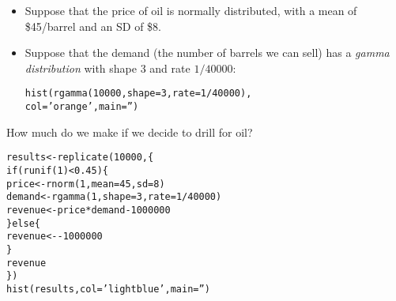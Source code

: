 \documentclass{beamer}\usepackage[]{graphicx}\usepackage[]{color}
\makeatletter
\newcommand{\hlnum}[1]{\textcolor[rgb]{0.824,0.412,0.118}{#1}}%
\newcommand{\hlstr}[1]{\textcolor[rgb]{1,0.894,0.71}{#1}}%
\newcommand{\hlopt}[1]{\textcolor[rgb]{1,0.894,0.769}{#1}}%
\newcommand{\hlstd}[1]{\textcolor[rgb]{1,0.894,0.769}{#1}}%
\newcommand{\hlkwa}[1]{\textcolor[rgb]{0.941,0.902,0.549}{#1}}%
\newcommand{\hlkwb}[1]{\textcolor[rgb]{0.804,0.776,0.451}{#1}}%
\newcommand{\hlkwc}[1]{\textcolor[rgb]{0.78,0.941,0.545}{#1}}%
\newcommand{\hlkwd}[1]{\textcolor[rgb]{1,0.78,0.769}{#1}}%
\newenvironment{kframe}{%
 \def\at@end@of@kframe{}%
 \ifinner\ifhmode%
  \def\at@end@of@kframe{\end{minipage}}%
  \begin{minipage}{\columnwidth}%
 \fi\fi%
 \def\FrameCommand##1{\hskip\@totalleftmargin \hskip-\fboxsep
 \colorbox{shadecolor}{##1}\hskip-\fboxsep
     \hskip-\linewidth \hskip-\@totalleftmargin \hskip\columnwidth}%
 \MakeFramed {\advance\hsize-\width
   \@totalleftmargin\z@ \linewidth\hsize
   \@setminipage}}%
 {\par\unskip\endMakeFramed%
 \at@end@of@kframe}
\newenvironment{knitrout}{}{} %
\makeatother
\begin{document}
\begin{darkframes}
    \begin{frame}[fragile]
      \fontsize{10}{10}\selectfont
      \begin{itemize}
        \item Suppose that the price of oil is normally distributed, with a mean of \$45/barrel and an SD of \$8.
        \item Suppose that the demand (the number of barrels we can sell) has a \emph{gamma distribution} with shape 3 and rate $1/40000$:
\begin{knitrout}
\begin{kframe}
\begin{alltt}
\hlkwd{hist}\hlstd{(}\hlkwd{rgamma}\hlstd{(}\hlnum{10000}\hlstd{,} \hlkwc{shape}\hlstd{=}\hlnum{3}\hlstd{,} \hlkwc{rate}\hlstd{=}\hlnum{1}\hlopt{/}\hlnum{40000}\hlstd{),}
  \hlkwc{col}\hlstd{=}\hlstr{'orange'}\hlstd{,} \hlkwc{main}\hlstd{=}\hlstr{''}\hlstd{)}
\end{alltt}
\end{kframe}


\end{knitrout}
      \end{itemize}
      \lc
    \end{frame}

    \begin{frame}[fragile]
      \fontsize{9}{9}\selectfont
      How much do we make if we decide to drill for oil?
\begin{knitrout}
\begin{kframe}
\begin{alltt}
\hlstd{results} \hlkwb{<-} \hlkwd{replicate}\hlstd{(}\hlnum{10000}\hlstd{, \{}
  \hlkwa{if} \hlstd{(}\hlkwd{runif}\hlstd{(}\hlnum{1}\hlstd{)} \hlopt{<} \hlnum{0.45}\hlstd{) \{}
    \hlstd{price} \hlkwb{<-} \hlkwd{rnorm}\hlstd{(}\hlnum{1}\hlstd{,} \hlkwc{mean}\hlstd{=}\hlnum{45}\hlstd{,} \hlkwc{sd}\hlstd{=}\hlnum{8}\hlstd{)}
    \hlstd{demand} \hlkwb{<-} \hlkwd{rgamma}\hlstd{(}\hlnum{1}\hlstd{,} \hlkwc{shape}\hlstd{=}\hlnum{3}\hlstd{,} \hlkwc{rate}\hlstd{=}\hlnum{1}\hlopt{/}\hlnum{40000}\hlstd{)}
    \hlstd{revenue} \hlkwb{<-} \hlstd{price} \hlopt{*} \hlstd{demand} \hlopt{-} \hlnum{1000000}
  \hlstd{\}} \hlkwa{else} \hlstd{\{}
    \hlstd{revenue} \hlkwb{<-} \hlopt{-}\hlnum{1000000}
  \hlstd{\}}
  \hlstd{revenue}
\hlstd{\})}
\hlkwd{hist}\hlstd{(results,} \hlkwc{col}\hlstd{=}\hlstr{'lightblue'}\hlstd{,} \hlkwc{main}\hlstd{=}\hlstr{''}\hlstd{)}
\end{alltt}
\end{kframe}



\end{knitrout}
\end{frame}
\end{darkframes}
\end{document}
